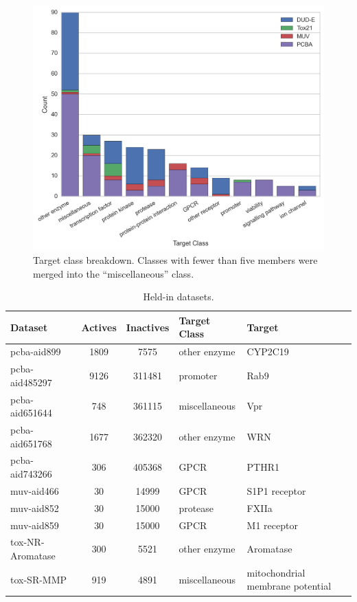 \begin{figure}[ht]
\centering
\includegraphics[width=\linewidth]{Images/target_bar.png}
\caption{Target class breakdown. Classes with fewer than five members were
  merged into the ``miscellaneous'' class.}
\label{fig:target_bar}
\end{figure}

\clearpage

\begin{table}[ht]
\centering
\caption{Held-in datasets.}
\label{tab:held-in}
\vskip 0.2in
\begin{tabular}{lSSll}
\toprule
\bfseries Dataset & \bfseries Actives & \bfseries Inactives & \bfseries Target Class & \bfseries Target \\
\midrule
pcba-aid899 & 1809 & 7575 & other enzyme & CYP2C19 \\
pcba-aid485297 & 9126 & 311481 & promoter & Rab9 \\
pcba-aid651644 & 748 & 361115 & miscellaneous & Vpr \\
pcba-aid651768 & 1677 & 362320 & other enzyme & WRN \\
pcba-aid743266 & 306 & 405368 & GPCR & PTHR1 \\
muv-aid466 & 30 & 14999 & GPCR & S1P1 receptor \\
muv-aid852 & 30 & 15000 & protease & FXIIa \\
muv-aid859 & 30 & 15000 & GPCR & M1 receptor \\
tox-NR-Aromatase & 300 & 5521 & other enzyme & Aromatase \\
tox-SR-MMP & 919 & 4891 & miscellaneous & mitochondrial membrane potential \\
\bottomrule
\end{tabular}
\end{table}


